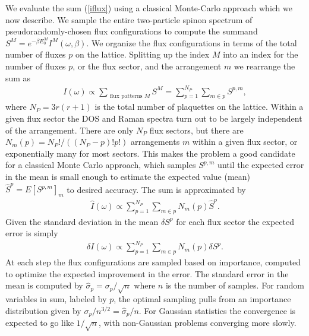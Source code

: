 \documentclass[reprint,amsmath,amssymb,aps,prl,groupedaddress,nofootinbib,superscriptaddress]{revtex4-1}
\newcommand{\1}{\mathds{1}}
\begin{document}
We evaluate the sum (\ref{iflux}) using a classical Monte-Carlo approach which we now describe. %
We sample the entire two-particle spinon spectrum of pseudorandomly-chosen flux configurations to compute the summand $S^M = e^{-\beta E_0^M} I^M(\omega,\beta)$. %
We organize the flux configurations in terms of the total number of fluxes $p$ on the lattice. Splitting up the index $M$ into an index for the number of fluxes $p$, or the flux sector, and the arrangement $m$ we rearrange the sum as  
\begin{align}
I(\omega) \propto \sum_{\text{ flux patterns } M}  S^M = \sum_{p=1}^{N_P} \sum_{m \in p} S^{p,m},
\end{align}
where $N_P = 3 r(r+1)$ is the total number of plaquettes on the lattice. Within a given flux sector the DOS and Raman spectra turn out to be largely independent of the arrangement.%
There are only $N_P$ flux sectors, but there are $N_m(p) = N_P! / ( (N_P - p)! p! )$ arrangements $m$ within a given flux sector, or exponentially many for most sectors. This makes the problem a good candidate for a classical Monte Carlo approach, which samples $S^{p,m}$ until the expected error in the mean is small enough to estimate the expected value (mean) $\hat{S}^p = E[S^{p,m}]_m$ to desired accuracy. The sum is approximated by  
\begin{align}
\hat{I}(\omega) \propto \sum_{p=1}^{N_P} \sum_{m \in p} N_m(p) \hat{S}^p.
\end{align}
Given the standard deviation in the mean $\delta S^p$ for each flux sector the expected error is simply 
\begin{align}
\delta I(\omega) \propto \sum_{p=1}^{N_P} \sum_{m \in p} N_m(p) \delta {S}^p.
\end{align}
At each step the flux configurations are sampled based on importance, computed to optimize the expected improvement in the error. The standard error in the mean is computed by $\hat{\sigma}_p = \sigma_p/\sqrt{n}$ where $n$ is the number of samples. For random variables in sum, labeled by $p$, the optimal sampling pulls from an importance distribution given by $\sigma_p/n^{3/2} = \hat{\sigma}_p/n$. For Gaussian statistics the convergence is expected to go like $1/\sqrt{n}$, with non-Gaussian problems converging more slowly. %
\end{document}
